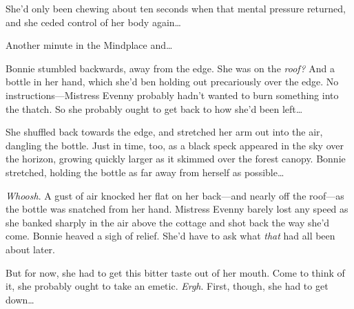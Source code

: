 She'd only been chewing about ten seconds when that mental pressure returned, and she ceded control of her body again{\dots}


Another minute in the Mindplace and{\dots}


Bonnie stumbled backwards, away from the edge.
She was on the \emph{roof?}
And a bottle in her hand, which she'd ben holding out precariously over the edge.
No instructions---Mistress Evenny probably hadn't wanted to burn something into the thatch.
So she probably ought to get back to how she'd been left{\dots}

She shuffled back towards the edge, and stretched her arm out into the air, dangling the bottle.
Just in time, too, as a black speck appeared in the sky over the horizon, growing quickly larger as it skimmed over the forest canopy.
Bonnie stretched, holding the bottle as far away from herself as possible{\dots}

\emph{Whoosh}.
A gust of air knocked her flat on her back---and nearly off the roof---as the bottle was snatched from her hand.
Mistress Evenny barely lost any speed as she banked sharply in the air above the cottage and shot back the way she'd come.
Bonnie heaved a sigh of relief.
She'd have to ask what \emph{that} had all been about later.

But for now, she had to get this bitter taste out of her mouth.
Come to think of it, she probably ought to take an emetic.
\emph{Ergh}.
First, though, she had to get down{\dots}
